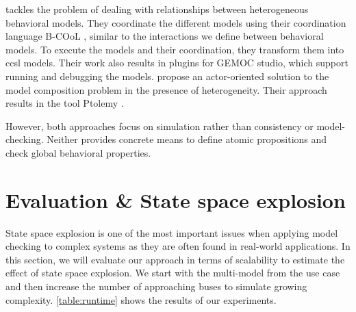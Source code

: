 \documentclass{jot}
\begin{document}
\cite{deantoniModelingBehavioralSemantics2016} tackles the problem of dealing with relationships between heterogeneous behavioral models.
They coordinate the different models using their coordination language B-COoL \cite{varalarsenBCoolBehavioralCoordination2016}, similar to the interactions we define between behavioral models.
To execute the models and their coordination, they transform them into \gls*{ccsl} models.  
Their work also results in plugins for GEMOC studio, which support running and debugging the models.
\cite{ekerTamingHeterogeneityPtolemy2003, leeDisciplinedHeterogeneousModeling2010} propose an actor-oriented solution to the model composition problem in the presence of heterogeneity.
Their approach results in the tool Ptolemy \cite{ptolemaeusSystemDesignModeling2014}.

However, both approaches focus on simulation rather than consistency or model-checking.
Neither provides concrete means to define atomic propositions and check global behavioral properties.

\section{Evaluation \& State space explosion}

State space explosion is one of the most important issues when applying model checking to complex systems as they are often found in real-world applications.
In this section, we will evaluate our approach in terms of scalability to estimate the effect of state space explosion.
We start with the multi-model from the use case and then increase the number of approaching buses to simulate growing complexity.
\autoref{table:runtime} shows the results of our experiments.
\end{document}
